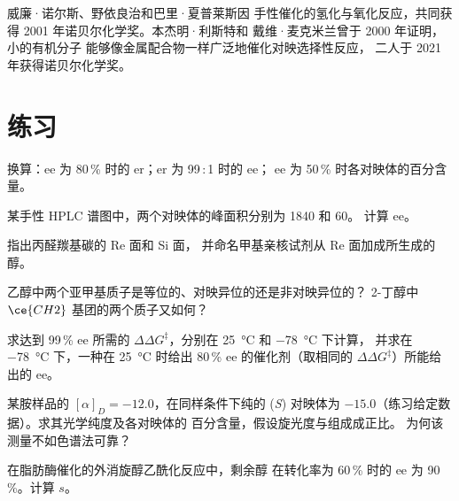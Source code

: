 \begin{history}[非对称催化的两项诺贝尔奖]
威廉·诺尔斯、野依良治和巴里·夏普莱斯因
手性催化的氢化与氧化反应，共同获得 2001 年诺贝尔化学奖。本杰明·利斯特和
戴维·麦克米兰曾于 2000 年证明，小的有机分子
能够像金属配合物一样广泛地催化对映选择性反应，
二人于 2021 年获得诺贝尔化学奖。
\end{history}

\section{练习}

\begin{exercise}[$\star$]\label{exo:b3:asymmetric-synthesis:1}
换算：ee 为 80\,\% 时的 er；er 为 99\,:\,1 时的 ee；
ee 为 50\,\% 时各对映体的百分含量。
\end{exercise}

\begin{exercise}[$\star$]\label{exo:b3:asymmetric-synthesis:2}
某手性 HPLC 谱图中，两个对映体的峰面积分别为 1840 和 60。
计算 ee。
\end{exercise}

\begin{exercise}[$\star$]\label{exo:b3:asymmetric-synthesis:3}
指出丙醛羰基碳的 Re 面和 Si 面，
并命名甲基亲核试剂从 Re 面加成所生成的醇。
\end{exercise}

\begin{exercise}[$\star$]\label{exo:b3:asymmetric-synthesis:4}
乙醇中两个亚甲基质子是等位的、对映异位的还是非对映异位的？
2-丁醇中 $\ce{CH2}$ 基团的两个质子又如何？
\end{exercise}

\begin{exercise}[$\star\star$]\label{exo:b3:asymmetric-synthesis:5}
求达到 99\,\% ee 所需的 $\Delta\Delta G^\ddagger$，分别在 \qty{25}{\celsius} 和 \qty{-78}{\celsius} 下计算，
并求在 \qty{-78}{\celsius} 下，一种在 \qty{25}{\celsius} 时给出 80\,\% ee 的催化剂（取相同的 $\Delta\Delta G^\ddagger$）所能给出的 ee。
\end{exercise}

\begin{exercise}[$\star\star$]\label{exo:b3:asymmetric-synthesis:6}
某胺样品的 $[\alpha]_D = -12.0$，在同样条件下纯的 (\textit{S})
对映体为 $-15.0$（练习给定数据）。求其光学纯度及各对映体的
百分含量，假设旋光度与组成成正比。
为何该测量不如色谱法可靠？
\end{exercise}

\begin{exercise}[$\star\star$]\label{exo:b3:asymmetric-synthesis:7}
在脂肪酶催化的外消旋醇乙酰化反应中，剩余醇
在转化率为 60\,\% 时的 ee 为 90\,\%。计算 $s$。
\end{exercise}

